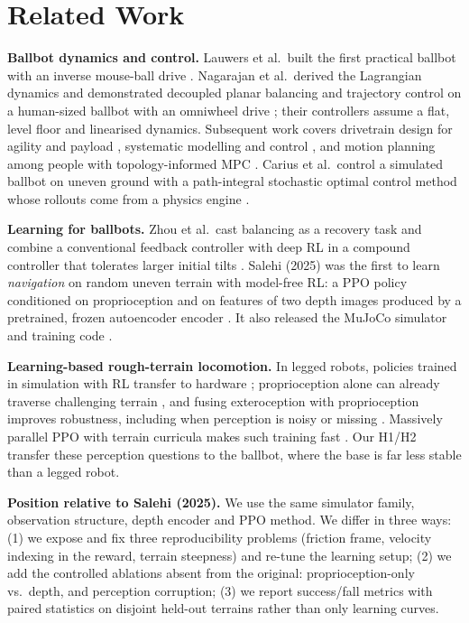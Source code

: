 \documentclass[conference]{IEEEtran}
\begin{document}
\section{Related Work}
\textbf{Ballbot dynamics and control.} Lauwers et al.\ built the first practical ballbot with an inverse mouse-ball drive \cite{lauwers2006}. Nagarajan et al.\ derived the Lagrangian dynamics and demonstrated decoupled planar balancing and trajectory control on a human-sized ballbot with an omniwheel drive \cite{nagarajan2014}; their controllers assume a flat, level floor and linearised dynamics. Subsequent work covers drivetrain design for agility and payload \cite{xiao2023}, systematic modelling and control \cite{abdelrahim2025}, and motion planning among people with topology-informed MPC \cite{mavrogiannis2021}. Carius et al.\ control a simulated ballbot on uneven ground with a path-integral stochastic optimal control method whose rollouts come from a physics engine \cite{carius2022}.

\textbf{Learning for ballbots.} Zhou et al.\ cast balancing as a recovery task and combine a conventional feedback controller with deep RL in a compound controller that tolerates larger initial tilts \cite{zhou2022}. Salehi (2025) was the first to learn \emph{navigation} on random uneven terrain with model-free RL: a PPO policy \cite{schulman2017} conditioned on proprioception and on features of two depth images produced by a pretrained, frozen autoencoder encoder \cite{salehi2025}. It also released the MuJoCo simulator and training code \cite{salehi2025code}.

\textbf{Learning-based rough-terrain locomotion.} In legged robots, policies trained in simulation with RL transfer to hardware \cite{hwangbo2019}; proprioception alone can already traverse challenging terrain \cite{lee2020}, and fusing exteroception with proprioception improves robustness, including when perception is noisy or missing \cite{miki2022}. Massively parallel PPO with terrain curricula makes such training fast \cite{rudin2022}. Our H1/H2 transfer these perception questions to the ballbot, where the base is far less stable than a legged robot.

\textbf{Position relative to Salehi (2025).} We use the same simulator family, observation structure, depth encoder and PPO method. We differ in three ways: (1) we expose and fix three reproducibility problems (friction frame, velocity indexing in the reward, terrain steepness) and re-tune the learning setup; (2) we add the controlled ablations absent from the original: proprioception-only vs.\ depth, and perception corruption; (3) we report success/fall metrics with paired statistics on disjoint held-out terrains rather than only learning curves.
\end{document}
